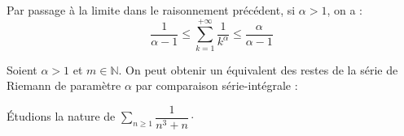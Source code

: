 \documentclass[french,11pt,twoside]{VcCours}
\newcommand{\dx}{\text{d}x}
\newcommand{\Sum}[2]{\ensuremath{\textstyle{\sum\limits_{#1}^{#2}}}}
\begin{document}
\begin{rems}
\item Par passage à la limite dans le raisonnement précédent, si $\alpha>1$, on a :
$$ \frac{1}{\alpha-1} \leq \sum_{k=1}^{+ \infty} \frac{1}{k^{\alpha}} \leq  \frac{\alpha}{\alpha-1}$$
\item Soient $\alpha >1$ et $m \in \mathbb{N}$. On peut obtenir un équivalent des restes de la série de Riemann de paramètre $\alpha$ par comparaison série-intégrale :
%

\vspace{13cm}
\end{rems}

\begin{ex} Étudions la nature de $\Sum{n \geq 1}{} \dfrac{1}{n^3+n} \cdot$

\vspace{3cm}
\end{ex}
\end{document}
